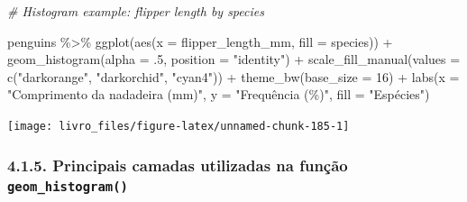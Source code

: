\documentclass[
]{book}
\newenvironment{Shaded}{\begin{snugshade}}{\end{snugshade}}
\newcommand{\AttributeTok}[1]{\textcolor[rgb]{0.61,0.61,0.61}{#1}}
\newcommand{\CommentTok}[1]{\textcolor[rgb]{0.37,0.37,0.37}{\textit{#1}}}
\newcommand{\DecValTok}[1]{\textcolor[rgb]{0.06,0.06,0.06}{#1}}
\newcommand{\FunctionTok}[1]{\textcolor[rgb]{0,0,0}{#1}}
\newcommand{\NormalTok}[1]{#1}
\newcommand{\SpecialCharTok}[1]{\textcolor[rgb]{0,0,0}{#1}}
\newcommand{\StringTok}[1]{\textcolor[rgb]{0.5,0.5,0.5}{#1}}
\begin{document}
\begin{Shaded}
\begin{Highlighting}[]
\CommentTok{\# Histogram example: flipper length by species}

\NormalTok{penguins }\SpecialCharTok{\%\textgreater{}\%} 
\FunctionTok{ggplot}\NormalTok{(}\FunctionTok{aes}\NormalTok{(}\AttributeTok{x =}\NormalTok{ flipper\_length\_mm, }\AttributeTok{fill =}\NormalTok{ species)) }\SpecialCharTok{+}
  \FunctionTok{geom\_histogram}\NormalTok{(}\AttributeTok{alpha =}\NormalTok{ .}\DecValTok{5}\NormalTok{, }\AttributeTok{position =} \StringTok{"identity"}\NormalTok{) }\SpecialCharTok{+}
  \FunctionTok{scale\_fill\_manual}\NormalTok{(}\AttributeTok{values =} \FunctionTok{c}\NormalTok{(}\StringTok{"darkorange"}\NormalTok{, }\StringTok{"darkorchid"}\NormalTok{, }\StringTok{"cyan4"}\NormalTok{)) }\SpecialCharTok{+}
  \FunctionTok{theme\_bw}\NormalTok{(}\AttributeTok{base\_size =} \DecValTok{16}\NormalTok{) }\SpecialCharTok{+}
  \FunctionTok{labs}\NormalTok{(}\AttributeTok{x =} \StringTok{"Comprimento da nadadeira (mm)"}\NormalTok{, }
       \AttributeTok{y =} \StringTok{"Frequência (\%)"}\NormalTok{, }
       \AttributeTok{fill =} \StringTok{"Espécies"}\NormalTok{)}
\end{Highlighting}
\end{Shaded}

\begin{center}\texttt{[image: livro\_files/figure-latex/unnamed-chunk-185-1]} \end{center}

\hypertarget{principais-camadas-utilizadas-na-funuxe7uxe3o-geom_histogram}{%
\subsubsection{\texorpdfstring{4.1.5. Principais camadas utilizadas na função \texttt{geom\_histogram()}}{4.1.5. Principais camadas utilizadas na função geom\_histogram()}}\label{principais-camadas-utilizadas-na-funuxe7uxe3o-geom_histogram}}
\end{document}
